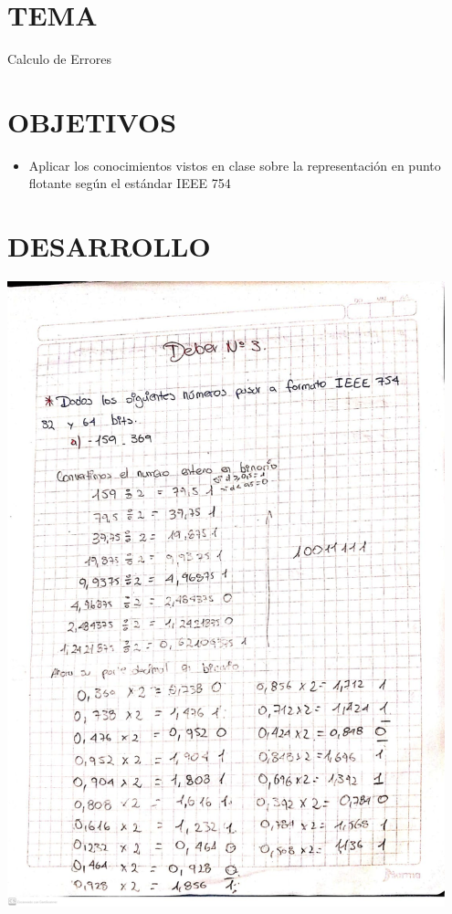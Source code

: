 \documentclass[12pt]{article}
\begin{document}
\section*{TEMA}
{Calculo de Errores}

\vspace{0.5cm}

\section*{OBJETIVOS}
\begin{itemize}
    \item { Aplicar los conocimientos vistos en clase sobre la representación en punto flotante según el estándar IEEE 754}
\end{itemize}

\vspace{0.5cm}

\section*{DESARROLLO}
\begin{minipage}{0.95\textwidth}
    \raggedleft
    \includegraphics[width=0.95\textwidth]{inFiles/Figures/ej1.jpeg}
\end{minipage}
\end{document}
